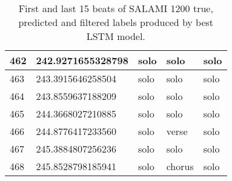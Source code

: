 \begin{table}[t]
\begin{tabular}{|l|l|l|l|l|}
    462                  & 242.9271655328798    & solo                 & solo                     & solo                    \\ \hline
    463                  & 243.3915646258504    & solo                 & solo                     & solo                    \\ \hline
    464                  & 243.8559637188209    & solo                 & solo                     & solo                    \\ \hline
    465                  & 244.3668027210885    & solo                 & solo                     & solo                    \\ \hline
    466                  & 244.8776417233560    & solo                 & verse                    & solo                    \\ \hline
    467                  & 245.3884807256236    & solo                 & solo                     & solo                    \\ \hline
    468                  & 245.8528798185941    & solo                 & chorus                   & solo                    \\ \hline
    \end{tabular}
    \caption{First and last 15 beats of SALAMI 1200 true, predicted and filtered labels produced by best LSTM model.}
    \label{tab:1200_lstm}
\end{table}